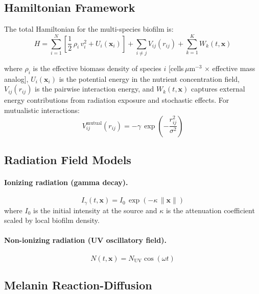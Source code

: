 \documentclass[11pt]{article}
\begin{document}
\subsection{Hamiltonian Framework}
\label{sec:hamiltonian}

The total Hamiltonian for the multi-species biofilm is:
\begin{equation}
\label{eq:hamiltonian}
H = \sum_{i=1}^{N}\!\left[\frac{1}{2}\,\rho_i\,v_i^2 + U_i(\mathbf{x}_i)\right]
  + \sum_{i\neq j} V_{ij}(r_{ij})
  + \sum_{k=1}^{K} W_k(t,\mathbf{x})
\end{equation}

\noindent where $\rho_i$ is the effective biomass density of species $i$ [cells\,$\mu$m$^{-3}$
$\times$ effective mass analog], $U_i(\mathbf{x}_i)$ is the potential energy in the nutrient
concentration field, $V_{ij}(r_{ij})$ is the pairwise interaction energy, and $W_k(t,\mathbf{x})$
captures external energy contributions from radiation exposure and stochastic effects. For
mutualistic interactions:
\begin{equation}
  V_{ij}^{\mathrm{mutual}}(r_{ij}) = -\gamma\,\exp\!\left(-\frac{r_{ij}^2}{\sigma^2}\right)
\end{equation}

\subsection{Radiation Field Models}

\paragraph{Ionizing radiation (gamma decay).}
\begin{equation}
\label{eq:gamma_field}
I_\gamma(t,\mathbf{x}) = I_0\,\exp(-\kappa\,\|\mathbf{x}\|)
\end{equation}
where $I_0$ is the initial intensity at the source and $\kappa$ is the attenuation coefficient
scaled by local biofilm density.

\paragraph{Non-ionizing radiation (UV oscillatory field).}
\begin{equation}
\label{eq:uv_field}
N(t,\mathbf{x}) = N_{\mathrm{UV}}\cos(\omega t)
\end{equation}

\subsection{Melanin Reaction-Diffusion}
\end{document}
